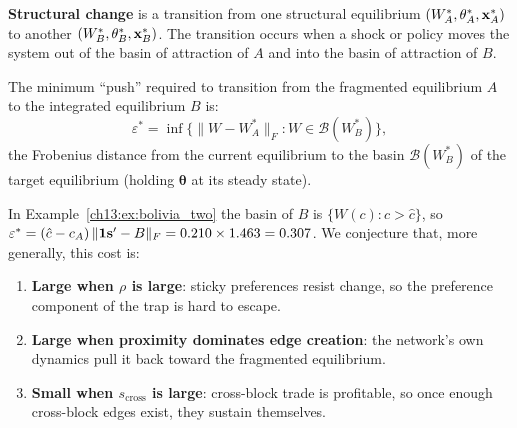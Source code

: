 \documentclass[../structural_economics_book.tex]{subfiles}
\begin{document}
\begin{definition}\label{ch13:def:structural_change}
\textbf{Structural change} is a transition from one structural equilibrium $(W^*_A, \theta^*_A, \mathbf{x}^*_A)$ to another $(W^*_B, \theta^*_B, \mathbf{x}^*_B)$. The transition occurs when a shock or policy moves the system out of the basin of attraction of $A$ and into the basin of attraction of $B$.
\end{definition}

\begin{definition}\label{ch13:prop:cost}
The minimum ``push'' required to transition from the fragmented equilibrium $A$ to the integrated equilibrium $B$ is:
\begin{equation}\label{ch13:eq:push}
\varepsilon^* = \inf\{\|W - W^*_A\|_F : W \in \mathcal{B}(W^*_B)\},
\end{equation}
the Frobenius distance from the current equilibrium to the basin $\mathcal{B}(W^*_B)$ of the target equilibrium (holding $\boldsymbol{\theta}$ at its steady state).
\end{definition}

In Example~\ref{ch13:ex:bolivia_two} the basin of $B$ is $\{W(c): c > \hat c\}$, so $\varepsilon^* = (\hat c - c_A)\,\|\mathbf{1}\mathbf{s}' - B\|_F = 0.210 \times 1.463 = 0.307$. We conjecture that, more generally, this cost is:
\begin{enumerate}
\item \textbf{Large when $\rho$ is large}: sticky preferences resist change, so the preference component of the trap is hard to escape.
\item \textbf{Large when proximity dominates edge creation}: the network's own dynamics pull it back toward the fragmented equilibrium.
\item \textbf{Small when $s_{\text{cross}}$ is large}: cross-block trade is profitable, so once enough cross-block edges exist, they sustain themselves.
\end{enumerate}
\end{document}
